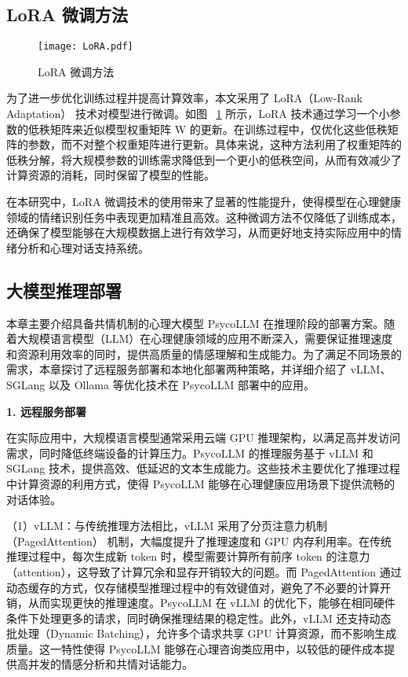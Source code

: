 \subsection{LoRA 微调方法}

\begin{figure}[ht]
  \centering
  \texttt{[image: LoRA.pdf]}
  \caption{LoRA 微调方法}
  \label{fig:LoRA}
\end{figure}

为了进一步优化训练过程并提高计算效率，本文采用了 LoRA（Low-Rank Adaptation）\cite{hu2022lora} 技术对模型进行微调。如图 ~\ref{fig:LoRA} 所示，LoRA 技术通过学习一个小参数的低秩矩阵来近似模型权重矩阵 W 的更新。在训练过程中，仅优化这些低秩矩阵的参数，而不对整个权重矩阵进行更新。具体来说，这种方法利用了权重矩阵的低秩分解，将大规模参数的训练需求降低到一个更小的低秩空间，从而有效减少了计算资源的消耗，同时保留了模型的性能。

在本研究中，LoRA 微调技术的使用带来了显著的性能提升，使得模型在心理健康领域的情绪识别任务中表现更加精准且高效。这种微调方法不仅降低了训练成本，还确保了模型能够在大规模数据上进行有效学习，从而更好地支持实际应用中的情绪分析和心理对话支持系统。

\subsection{大模型推理部署}

本章主要介绍具备共情机制的心理大模型 PsycoLLM 在推理阶段的部署方案。随着大规模语言模型（LLM）在心理健康领域的应用不断深入，需要保证推理速度和资源利用效率的同时，提供高质量的情感理解和生成能力。为了满足不同场景的需求，本章探讨了远程服务部署和本地化部署两种策略，并详细介绍了 vLLM\cite{kwon2023efficient}、SGLang\cite{zheng2024SGLangefficientexecutionstructured} 以及 Ollama 等优化技术在 PsycoLLM 部署中的应用。

\textbf{1. 远程服务部署}

在实际应用中，大规模语言模型通常采用云端 GPU 推理架构，以满足高并发访问需求，同时降低终端设备的计算压力。PsycoLLM 的推理服务基于 vLLM 和 SGLang 技术，提供高效、低延迟的文本生成能力。这些技术主要优化了推理过程中计算资源的利用方式，使得 PsycoLLM 能够在心理健康应用场景下提供流畅的对话体验。

（1）vLLM：与传统推理方法相比，vLLM 采用了分页注意力机制（PagedAttention） 机制，大幅度提升了推理速度和 GPU 内存利用率。在传统推理过程中，每次生成新 token 时，模型需要计算所有前序 token 的注意力（attention），这导致了计算冗余和显存开销较大的问题。而 PagedAttention 通过动态缓存的方式，仅存储模型推理过程中的有效键值对，避免了不必要的计算开销，从而实现更快的推理速度。PsycoLLM 在 vLLM 的优化下，能够在相同硬件条件下处理更多的请求，同时确保推理结果的稳定性。此外，vLLM 还支持动态批处理（Dynamic Batching），允许多个请求共享 GPU 计算资源，而不影响生成质量。这一特性使得 PsycoLLM 能够在心理咨询类应用中，以较低的硬件成本提供高并发的情感分析和共情对话能力。

